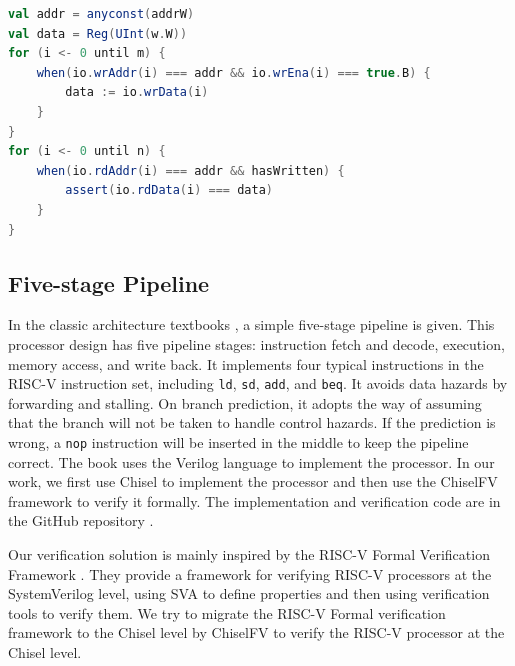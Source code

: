 \documentclass[conference]{IEEEtran}
\theoremstyle{definition}
\begin{document}
\begin{lstlisting}[language=scala, caption={Verification Code of Multi-ported Memory Module}, label=memassert]
val addr = anyconst(addrW)
val data = Reg(UInt(w.W))
for (i <- 0 until m) {
    when(io.wrAddr(i) === addr && io.wrEna(i) === true.B) {
        data := io.wrData(i)
    }
}
for (i <- 0 until n) {
    when(io.rdAddr(i) === addr && hasWritten) {
        assert(io.rdData(i) === data)
    }
}
\end{lstlisting}

\subsection{Five-stage Pipeline}
In the classic architecture textbooks \cite{patterson2017computer}, a simple five-stage pipeline is given. 
This processor design has five pipeline stages: instruction fetch and decode, execution, memory access, and write back. 
It implements four typical instructions in the RISC-V instruction set, including \verb|ld|, \verb|sd|, \verb|add|, and \verb|beq|.
It avoids data hazards by forwarding and stalling. On branch prediction, it adopts the way of assuming that the branch will not be taken to handle control hazards. If the prediction is wrong, a \verb|nop| instruction will be inserted in the middle to keep the pipeline correct.
The book uses the Verilog language to implement the processor. In our work, we first use Chisel to implement the processor and then use the ChiselFV framework to verify it formally. The implementation and verification code are in the GitHub repository \cite{riscvFvChisel}.

Our verification solution is mainly inspired by the RISC-V Formal Verification Framework \cite{riscv-formal}. They provide a framework for verifying RISC-V processors at the SystemVerilog level, using SVA to define properties and then using verification tools to verify them.
We try to migrate the RISC-V Formal verification framework to the Chisel level by ChiselFV to verify the RISC-V processor at the Chisel level.
\end{document}
